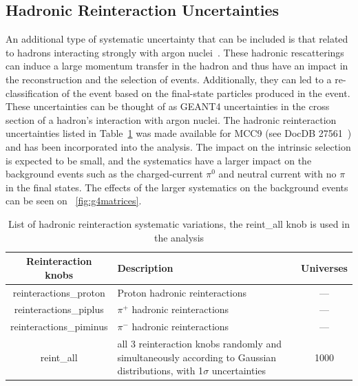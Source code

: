 \subsection{Hadronic Reinteraction Uncertainties }
\label{sec:systematics:reint}
An additional type of systematic uncertainty that can be included is that related to hadrons interacting strongly with argon nuclei~\cite{bib:reintslides}. These hadronic rescatterings can induce a large momentum transfer in the hadron and thus have an impact in the reconstruction and the selection of events. Additionally, they can led to a re-classification of the event based on the final-state particles produced in the event. These uncertainties can be thought of as GEANT4 uncertainties in the cross section of a hadron's interaction with argon nuclei. The hadronic reinteraction uncertainties listed in Table~\ref{tab:g4syst} was made available for MCC9 (see DocDB 27561~\cite{bib:g4uncertainties}) and has been incorporated into the analysis. The impact on the \nue intrinsic selection is expected to be small, and the systematics have a larger impact on the background events such as the charged-current $\pi^0$ and neutral current with no $\pi$ in the final states. The effects of the larger systematics on the background events can be seen on ~\cref{fig:g4matrices}.

\begin{table}[H]
\centering
 \begin{tabular}{| c | m{6cm} | c |} 
    \hline
\hline
Reinteraction knobs & Description & Universes \\
\hline
reinteractions\_proton        &  Proton hadronic reinteractions  & ---\\ 
reinteractions\_piplus   &  $\pi^+$ hadronic reinteractions & ---\\ 
reinteractions\_piminus        & $\pi^-$ hadronic reinteractions  & ---\\
\hline
reint\_all                    &  all 3 reinteraction knobs randomly and simultaneously according to Gaussian distributions, with 1$\sigma$ uncertainties  & 1000 \\
\hline
\end{tabular}
\caption{List of hadronic reinteraction systematic variations, the reint\_all knob is used in the analysis}
\label{tab:g4syst}
\end{table}

